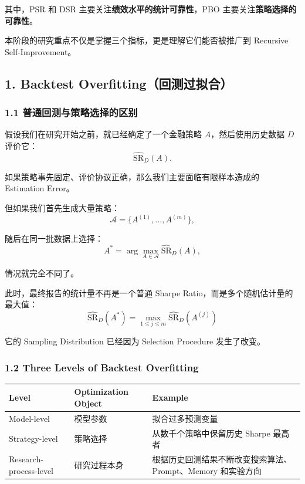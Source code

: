 其中，PSR 和 DSR 主要关注\textbf{绩效水平的统计可靠性}，PBO 主要关注\textbf{策略选择的可靠性}。

本阶段的研究重点不仅是掌握三个指标，更是理解它们能否被推广到 Recursive Self-Improvement。

\hypertarget{part-4-71-0001-backtest-overfittingux56deux6d4bux8fc7ux62dfux5408}{%
\subsection{1. Backtest Overfitting（回测过拟合）}\label{part-4-71-0001-backtest-overfittingux56deux6d4bux8fc7ux62dfux5408}}

\hypertarget{part-4-71-0001-ux666eux901aux56deux6d4bux4e0eux7b56ux7565ux9009ux62e9ux7684ux533aux522b}{%
\subsubsection{1.1 普通回测与策略选择的区别}\label{part-4-71-0001-ux666eux901aux56deux6d4bux4e0eux7b56ux7565ux9009ux62e9ux7684ux533aux522b}}

假设我们在研究开始之前，就已经确定了一个金融策略 \(A\)，然后使用历史数据 \(D\) 评价它：
\[\widehat{\mathrm{SR}}_D(A).\]

如果策略事先固定、评价协议正确，那么我们主要面临有限样本造成的 Estimation Error。

但如果我们首先生成大量策略：
\[\mathcal A=\{A^{(1)},\ldots,A^{(m)}\},\]

随后在同一批数据上选择：
\[A^*
=
\arg\max_{A\in\mathcal A}
\widehat{\mathrm{SR}}_D(A),\]

情况就完全不同了。

此时，最终报告的统计量不再是一个普通 Sharpe Ratio，而是多个随机估计量的最大值：
\[\boxed{
\widehat{\mathrm{SR}}_D(A^*)
=
\max_{1\leq j\leq m}
\widehat{\mathrm{SR}}_D(A^{(j)})
}\]

它的 Sampling Distribution 已经因为 Selection Procedure 发生了改变。

\hypertarget{part-4-71-0001-three-levels-of-backtest-overfitting}{%
\subsubsection{1.2 Three Levels of Backtest Overfitting}\label{part-4-71-0001-three-levels-of-backtest-overfitting}}

\begin{readertable}
\begin{longtable}[]{@{}
  >{\raggedright\arraybackslash}p{}
  >{\raggedright\arraybackslash}p{}
  >{\raggedright\arraybackslash}p{}@{}}
\toprule
Level & Optimization Object & Example \\
\midrule
\endhead
Model-level & 模型参数 & 拟合过多预测变量 \\
Strategy-level & 策略选择 & 从数千个策略中保留历史 Sharpe 最高者 \\
Research-process-level & 研究过程本身 & 根据历史回测结果不断改变搜索算法、Prompt、Memory 和实验方向 \\
\bottomrule
\end{longtable}
\end{readertable}

